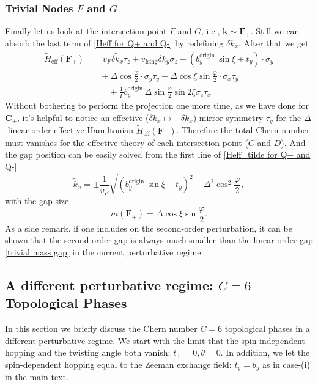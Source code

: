 \begin{subappendices}
	\subsubsection{Trivial Nodes $F$ and $G$}
	Finally let us look at the intersection point $F$ and $G$, i.e., $\bm{k}\sim\bm{F}_\pm$. Still we can absorb the last term of \eqref{Heff for Q+ and Q-} by redefining $\delta k_x$. After that we get
	\begin{align}\label{Heff_tilde for Q+ and Q-}
		\widetilde H_{\text{eff}}(\bm{F}_\pm) & =v_F\delta \tilde k_x \tau_z+v_{\text{Ising}}\delta k_y \sigma_z\mp (b_y^{\text{origin.}}\sin\xi\mp t_y)\cdot\sigma_y\nonumber \\
		                                      & \quad+\Delta\cos\frac{\varphi}{2}\cdot\sigma_y\tau_y\pm\Delta\cos\xi\sin\frac{\varphi}{2}\cdot\sigma_x\tau_y\nonumber          \\
		                                      & \quad\quad\pm\frac{1}{\Gamma}b_y^{\text{origin.}}\Delta\sin\frac{\varphi}{2}\sin 2\xi\sigma_z\tau_x
	\end{align}
	Without bothering to perform the projection one more time, as we have done for $\bm{C}_\pm$, it's helpful to notice an effective ($\delta k_x\mapsto -\delta k_x$) mirror symmetry $\tau_y$ for the $\Delta$-linear order effective Hamiltonian $\widetilde H_{\text{eff}}(\bm{F}_\pm)$. Therefore the total Chern number must vanishes for the effective theory of each intersection point ($C$ and $D$). And the gap position can be easily solved from the first line of \eqref{Heff_tilde for Q+ and Q-}
	\begin{equation*}
		\tilde k_x=\pm\dfrac{1}{v_F}\sqrt{(b_y^{\text{origin.}}\sin\xi-t_y)^2-\Delta^2\cos^2\frac{\varphi}{2}},
	\end{equation*}
	with the gap size
	\begin{equation}\label{trivial mass gap}
		m(\bm{F}_\pm)=\Delta\cos\xi\sin\frac{\varphi}{2}.
	\end{equation}
	As a side remark, if one includes on the second-order perturbation, it can be shown that the second-order gap is always much smaller than the linear-order gap \eqref{trivial mass gap} in the current perturbative regime.

	\subsection{A different perturbative regime: $C=6$ Topological Phases}
	In this section we briefly discuss the Chern number $C=6$ topological phases in a different perturbative regime. We start with the limit that the spin-independent hopping and the twisting angle both vanish: $t_\perp=0,\theta=0$. In addition, we let the spin-dependent hopping equal to the Zeeman exchange field: $t_y=b_y$ as in case-(i) in the main text.


\end{subappendices}
